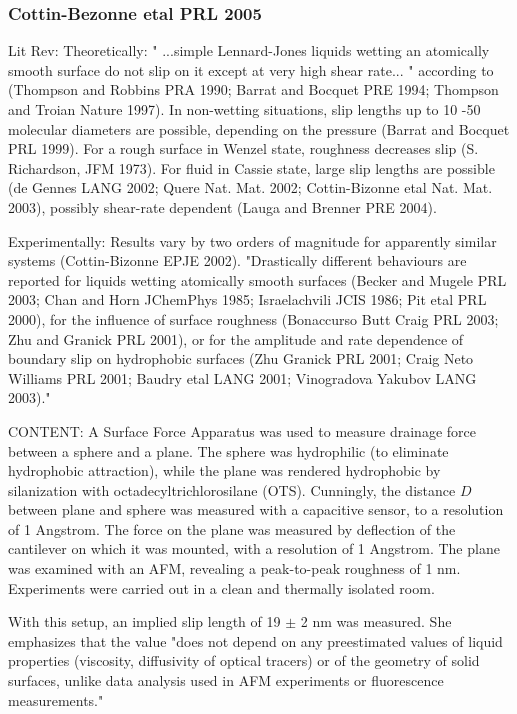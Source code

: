 \documentclass[twocolumn]{article}
\begin{document}
\subsubsection*{Cottin-Bezonne etal PRL 2005}
Lit Rev:
Theoretically: " ...simple Lennard-Jones liquids wetting an atomically smooth surface do not slip on it except at very high shear rate... " according to (Thompson and Robbins PRA 1990; Barrat and Bocquet PRE 1994; Thompson and Troian Nature 1997). In non-wetting situations, slip lengths up to 10 -50 molecular diameters are possible, depending on the pressure (Barrat and Bocquet PRL 1999). For a rough surface in Wenzel state, roughness decreases slip (S. Richardson, JFM 1973). For fluid in Cassie state, large slip lengths are possible (de Gennes LANG 2002; Quere Nat. Mat. 2002; Cottin-Bizonne etal Nat. Mat. 2003), possibly shear-rate dependent (Lauga and Brenner PRE 2004).

Experimentally: Results vary by two orders of magnitude for apparently similar systems (Cottin-Bizonne EPJE 2002). "Drastically different behaviours are reported for liquids wetting atomically smooth surfaces (Becker and Mugele PRL 2003; Chan and Horn JChemPhys 1985; Israelachvili JCIS 1986; Pit etal PRL 2000), for the influence of surface roughness (Bonaccurso Butt Craig PRL 2003; Zhu and Granick PRL 2001), or for the amplitude and rate dependence of boundary slip on hydrophobic surfaces (Zhu Granick PRL 2001; Craig Neto Williams PRL 2001; Baudry etal LANG 2001; Vinogradova Yakubov LANG 2003)."

CONTENT: A Surface Force Apparatus was used to measure drainage force between a sphere and a plane. The sphere was hydrophilic (to eliminate hydrophobic attraction), while the plane was rendered hydrophobic by silanization with octadecyltrichlorosilane (OTS). Cunningly, the distance $D$ between plane and sphere was measured with a capacitive sensor, to a resolution of 1 Angstrom. The force on the plane was measured by deflection of the  cantilever on which it was mounted, with a resolution of 1 Angstrom. The plane was examined with an AFM, revealing a peak-to-peak roughness of 1 nm. Experiments were carried out in a clean and thermally isolated room.

With this setup, an implied slip length of 19 $\pm$ 2 nm was measured.
She emphasizes that the value "does not depend on any preestimated values of liquid properties (viscosity, diffusivity of optical tracers) or of the geometry of solid surfaces, unlike data analysis used in AFM experiments or fluorescence measurements."
\end{document}
